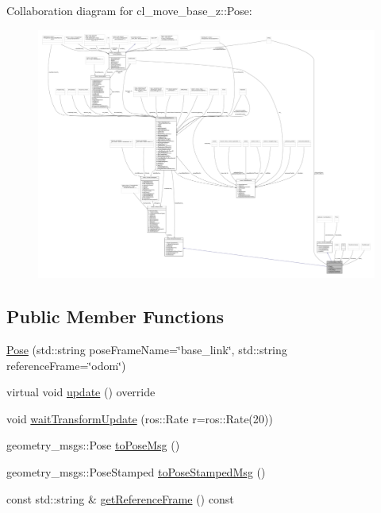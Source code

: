 Collaboration diagram for cl\+\_\+move\+\_\+base\+\_\+z\+:\+:Pose\+:
\nopagebreak
\begin{figure}[H]
\begin{center}
\leavevmode
\includegraphics[width=350pt]{classcl__move__base__z_1_1Pose__coll__graph}
\end{center}
\end{figure}
\subsection*{Public Member Functions}
\begin{DoxyCompactItemize}
\item 
\hyperlink{classcl__move__base__z_1_1Pose_aa361cd1347cfead0f244045fe183c600}{Pose} (std\+::string pose\+Frame\+Name=\char`\"{}base\+\_\+link\char`\"{}, std\+::string reference\+Frame=\char`\"{}odom\char`\"{})
\item 
virtual void \hyperlink{classcl__move__base__z_1_1Pose_abf99d1127cf51a93f97ada2031196114}{update} () override
\item 
void \hyperlink{classcl__move__base__z_1_1Pose_a5f8576c3dacfb2f2e7f9df5105c480ea}{wait\+Transform\+Update} (ros\+::\+Rate r=ros\+::\+Rate(20))
\item 
geometry\+\_\+msgs\+::\+Pose \hyperlink{classcl__move__base__z_1_1Pose_a9faf8c6b437ff6b19c8bddd692908dca}{to\+Pose\+Msg} ()
\item 
geometry\+\_\+msgs\+::\+Pose\+Stamped \hyperlink{classcl__move__base__z_1_1Pose_a63887a88c1ac6e9a4a71b8d7d11aed6c}{to\+Pose\+Stamped\+Msg} ()
\item 
const std\+::string \& \hyperlink{classcl__move__base__z_1_1Pose_af8c2dc151e74aa8da6b283d1c8563051}{get\+Reference\+Frame} () const
\end{DoxyCompactItemize}
